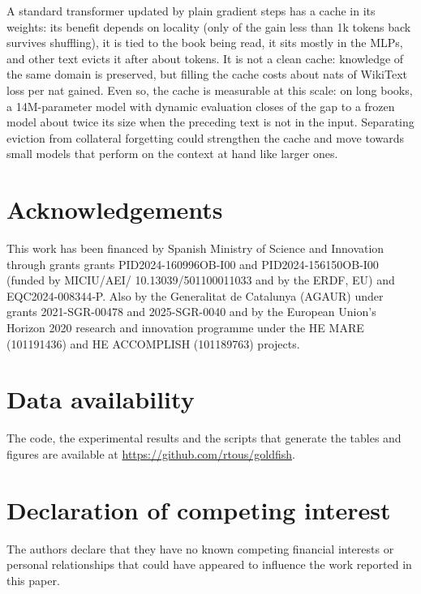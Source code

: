 \documentclass[times,twocolumn,final,authoryear]{elsarticle}
\begin{document}
A standard transformer updated by plain gradient steps has a cache in its weights: its benefit depends on locality (only \shuffledShareOneK{} of the gain less than 1k tokens back survives shuffling), it is tied to the book being read, it sits mostly in the MLPs, and other text evicts it after about \evictHalfLife{} tokens.
It is not a clean cache: knowledge of the same domain is preserved, but filling the cache costs about \wikiOverGainKOne{} nats of WikiText loss per nat gained.
Even so, the cache is measurable at this scale: on long books, a 14M-parameter model with dynamic evaluation closes \gapClosedFourteen{} of the gap to a frozen model about twice its size when the preceding text is not in the input.
Separating eviction from collateral forgetting could strengthen the cache and move towards small models that perform on the context at hand like larger ones.

\section*{Acknowledgements}
This work has been financed by Spanish Ministry of Science and Innovation through grants grants PID2024-160996OB-I00 and PID2024‑156150OB‑I00 (funded by MICIU/AEI/ 10.13039/501100011033 and by the ERDF, EU) and EQC2024‑008344‑P. Also by the Generalitat de Catalunya (AGAUR) under grants 2021-SGR-00478 and 2025-SGR-0040 and by the European Union’s Horizon 2020 research and innovation programme under the HE MARE (101191436) and HE ACCOMPLISH (101189763) projects.

\section*{Data availability}
The code, the experimental results and the scripts that generate the tables and figures are available at \url{https://github.com/rtous/goldfish}.

\section*{Declaration of competing interest}
The authors declare that they have no known competing financial interests or personal relationships that could have appeared to influence the work reported in this paper.



\end{document}
